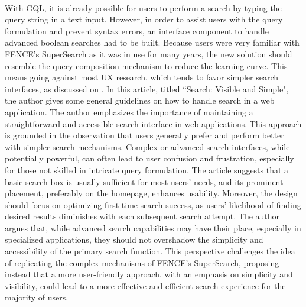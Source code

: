 \paragraph{} With GQL, it is already possible for users to perform a search by typing the query string in a text input. However, in order to assist users with the query formulation and prevent syntax errors, an interface component to handle advanced boolean searches had to be built. Because users were very familiar with FENCE's SuperSearch as it was in use for many years, the new solution should resemble the query composition mechanism to reduce the learning curve. This means going against most UX research, which tends to favor simpler search interfaces, as discussed on \cite{Nielsen2001SearchVisible}. In this article, titled ``Search: Visible and Simple", the author gives some general guidelines on how to handle search in a web application. The author emphasizes the importance of maintaining a straightforward and accessible search interface in web applications. This approach is grounded in the observation that users generally prefer and perform better with simpler search mechanisms. Complex or advanced search interfaces, while potentially powerful, can often lead to user confusion and frustration, especially for those not skilled in intricate query formulation. The article suggests that a basic search box is usually sufficient for most users’ needs, and its prominent placement, preferably on the homepage, enhances usability. Moreover, the design should focus on optimizing first-time search success, as users' likelihood of finding desired results diminishes with each subsequent search attempt. The author argues that, while advanced search capabilities may have their place, especially in specialized applications, they should not overshadow the simplicity and accessibility of the primary search function. This perspective challenges the idea of replicating the complex mechanisms of FENCE's SuperSearch, proposing instead that a more user-friendly approach, with an emphasis on simplicity and visibility, could lead to a more effective and efficient search experience for the majority of users.

